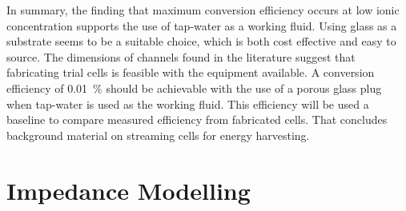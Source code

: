 

    In summary, the finding that maximum conversion efficiency occurs at low ionic concentration supports the use of tap-water as a working fluid.
    Using glass as a substrate seems to be a suitable choice, which is both cost effective and easy to source.
    The dimensions of channels found in the literature suggest that fabricating trial cells is feasible with the equipment available.
    A conversion efficiency of \SI{0.01}{\percent} should be achievable with the use of a porous glass plug when tap-water is used as the working fluid.
    This efficiency will be used a baseline to compare measured efficiency from fabricated cells.
    That concludes background material on streaming cells for energy harvesting.


\section{Impedance Modelling}
  \label{sect:background_impedanceModelling}

